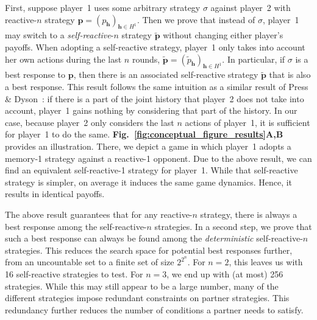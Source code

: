 \documentclass[9pt,twocolumn,twoside]{pnas-new}
\newcommand{\figref}[1]{{\textbf{Fig.~\ref{#1}}}}
\begin{document}
First, suppose player~1 uses some arbitrary strategy $\sigma$ against player~2 with reactive-$n$ strategy \mbox{$\mathbf{p}\!=\!(p_\mathbf{h})_{\mathbf{h}\in H^1}$}. 
Then we prove that instead of $\sigma$, player~1 may switch to a {\it self-reactive}-$n$ strategy $\mathbf{\tilde{p}}$ without changing either player's payoffs. 
When adopting a self-reactive strategy, player~1 only takes into account her own actions during the last $n$ rounds, 
$\mathbf{\tilde{p}} \!=\! (\tilde{p}_\mathbf{h})_{\mathbf{h} \in H^1}$.
In particular, if $\sigma$ is a best response to $\mathbf{p}$, then there is an associated self-reactive strategy $\mathbf{\tilde p}$ that is also a best response. 
This result follows the same intuition as a similar result of Press \& Dyson~\cite{press:PNAS:2012}: 
if there is a part of the joint history that player~2 does not take into account, player~1 gains nothing by considering that part of the history. 
In our case, because player~2 only considers the last $n$ actions of player~1, it is sufficient for player~1 to do the same.
\figref{fig:conceptual_figure_results}\textbf{A,B} provides an illustration.  
There, we depict a game in which player~1 adopts a memory-1 strategy against a reactive-1 opponent. 
Due to the above result, we can find an equivalent self-reactive-1 strategy for player~1. 
While that self-reactive strategy is simpler, on average it induces the same game dynamics. 
Hence, it results in identical payoffs. 

The above result guarantees that for any reactive-$n$ strategy, there is always a best response among the self-reactive-$n$ strategies. 
In a second step, we prove that such a best response can always be found among the {\it deterministic} self-reactive-$n$ strategies. 
This reduces the search space for potential best responses further, from an uncountable set to a finite set of size $2^{2^n}$. 
For $n\!=\!2$, this leaves us with 16 self-reactive strategies to test. 
For $n\!=\!3$, we end up with (at most) 256 strategies. 
While this may still appear to be a large number, many of the different strategies impose redundant constraints on partner strategies.
This redundancy further reduces the number of conditions a partner needs to satisfy.\\
\end{document}
